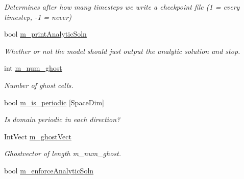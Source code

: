 \begin{DoxyCompactItemize}
\begin{DoxyCompactList}\small\item\em Determines after how many timesteps we write a checkpoint file (1 = every timestep, -\/1 = never) \end{DoxyCompactList}\item 
\hypertarget{classamr_mushy_layer_a5dc9a79e44987dfc24744c768dcb184b}{bool \hyperlink{classamr_mushy_layer_a5dc9a79e44987dfc24744c768dcb184b}{m\-\_\-print\-Analytic\-Soln}}\label{classamr_mushy_layer_a5dc9a79e44987dfc24744c768dcb184b}

\begin{DoxyCompactList}\small\item\em Whether or not the model should just output the analytic solution and stop. \end{DoxyCompactList}\item 
\hypertarget{classamr_mushy_layer_a04f94d886182e415a68c3dd1b8416902}{int \hyperlink{classamr_mushy_layer_a04f94d886182e415a68c3dd1b8416902}{m\-\_\-num\-\_\-ghost}}\label{classamr_mushy_layer_a04f94d886182e415a68c3dd1b8416902}

\begin{DoxyCompactList}\small\item\em Number of ghost cells. \end{DoxyCompactList}\item 
\hypertarget{classamr_mushy_layer_a77d4e6eba972c58097c3aa69331a3494}{bool \hyperlink{classamr_mushy_layer_a77d4e6eba972c58097c3aa69331a3494}{m\-\_\-is\-\_\-periodic} \mbox{[}Space\-Dim\mbox{]}}\label{classamr_mushy_layer_a77d4e6eba972c58097c3aa69331a3494}

\begin{DoxyCompactList}\small\item\em Is domain periodic in each direction? \end{DoxyCompactList}\item 
\hypertarget{classamr_mushy_layer_ad3c4cd03af4412e3e8005cbac57a6e84}{Int\-Vect \hyperlink{classamr_mushy_layer_ad3c4cd03af4412e3e8005cbac57a6e84}{m\-\_\-ghost\-Vect}}\label{classamr_mushy_layer_ad3c4cd03af4412e3e8005cbac57a6e84}

\begin{DoxyCompactList}\small\item\em Ghostvector of length m\-\_\-num\-\_\-ghost. \end{DoxyCompactList}\item 
\hypertarget{classamr_mushy_layer_ad685e67f8fef393030233177edfae6bf}{bool \hyperlink{classamr_mushy_layer_ad685e67f8fef393030233177edfae6bf}{m\-\_\-enforce\-Analytic\-Soln}}\label{classamr_mushy_layer_ad685e67f8fef393030233177edfae6bf}


\end{DoxyCompactItemize}
